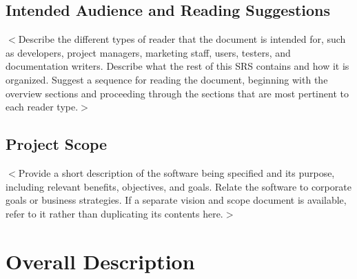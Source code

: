 \documentclass{scrreprt}
\begin{document}

\section{Intended Audience and Reading Suggestions}
$<$Describe the different types of reader that the document is intended for,
such as developers, project managers, marketing staff, users, testers, and
documentation writers. Describe what the rest of this SRS contains and how it is
organized. Suggest a sequence for reading the document, beginning with the
overview sections and proceeding through the sections that are most pertinent to
each reader type.$>$

\section{Project Scope}
$<$Provide a short description of the software being specified and its purpose,
including relevant benefits, objectives, and goals. Relate the software to
corporate goals or business strategies. If a separate vision and scope document
is available, refer to it rather than duplicating its contents here.$>$



\chapter{Overall Description}
\end{document}

